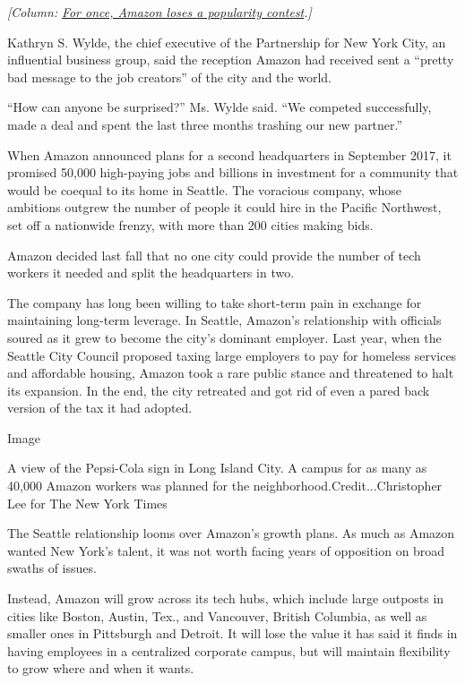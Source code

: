 \emph{{[}Column:}
\href{https://www.nytimes3xbfgragh.onion/2019/02/14/business/amazon-new-york-city.html}{\emph{For
once, Amazon loses a popularity contest}}\emph{.{]}}

Kathryn S. Wylde, the chief executive of the Partnership for New York
City, an influential business group, said the reception Amazon had
received sent a ``pretty bad message to the job creators'' of the city
and the world.

``How can anyone be surprised?'' Ms. Wylde said. ``We competed
successfully, made a deal and spent the last three months trashing our
new partner.''

When Amazon announced plans for a second headquarters in September 2017,
it promised 50,000 high-paying jobs and billions in investment for a
community that would be coequal to its home in Seattle. The voracious
company, whose ambitions outgrew the number of people it could hire in
the Pacific Northwest, set off a nationwide frenzy, with more than 200
cities making bids.

Amazon decided last fall that no one city could provide the number of
tech workers it needed and split the headquarters in two.

The company has long been willing to take short-term pain in exchange
for maintaining long-term leverage. In Seattle, Amazon's relationship
with officials soured as it grew to become the city's dominant employer.
Last year, when the Seattle City Council proposed taxing large employers
to pay for homeless services and affordable housing, Amazon took a rare
public stance and threatened to halt its expansion. In the end, the city
retreated and got rid of even a pared back version of the tax it had
adopted.

Image

A view of the Pepsi-Cola sign in Long Island City. A campus for as many
as 40,000 Amazon workers was planned for the
neighborhood.Credit...Christopher Lee for The New York Times

The Seattle relationship looms over Amazon's growth plans. As much as
Amazon wanted New York's talent, it was not worth facing years of
opposition on broad swaths of issues.

Instead, Amazon will grow across its tech hubs, which include large
outposts in cities like Boston, Austin, Tex., and Vancouver, British
Columbia, as well as smaller ones in Pittsburgh and Detroit. It will
lose the value it has said it finds in having employees in a centralized
corporate campus, but will maintain flexibility to grow where and when
it wants.

